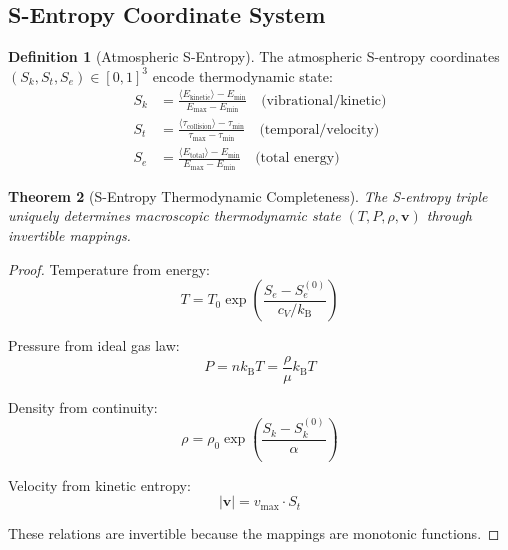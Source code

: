 \documentclass[twocolumn,10pt,a4paper]{article}
\newtheorem{theorem}{Theorem}[section]
\theoremstyle{definition}
\newtheorem{definition}[theorem]{Definition}
\theoremstyle{remark}
\newcommand{\kB}{k_{\mathrm{B}}}
\begin{document}
\subsection{S-Entropy Coordinate System}

\begin{definition}[Atmospheric S-Entropy]
\label{def:s_entropy_atm}
The atmospheric S-entropy coordinates $(S_k, S_t, S_e) \in [0,1]^3$ encode thermodynamic state:
\begin{align}
    S_k &= \frac{\langle E_{\text{kinetic}} \rangle - E_{\min}}{E_{\max} - E_{\min}} \quad \text{(vibrational/kinetic)} \\
    S_t &= \frac{\langle \tau_{\text{collision}} \rangle - \tau_{\min}}{\tau_{\max} - \tau_{\min}} \quad \text{(temporal/velocity)} \\
    S_e &= \frac{\langle E_{\text{total}} \rangle - E_{\min}}{E_{\max} - E_{\min}} \quad \text{(total energy)}
\end{align}
\end{definition}

\begin{theorem}[S-Entropy Thermodynamic Completeness]
\label{thm:completeness}
The S-entropy triple uniquely determines macroscopic thermodynamic state $(T, P, \rho, \mathbf{v})$ through invertible mappings.
\end{theorem}

\begin{proof}
Temperature from energy:
\begin{equation}
    T = T_0 \exp\left(\frac{S_e - S_e^{(0)}}{c_V/\kB}\right)
\end{equation}

Pressure from ideal gas law:
\begin{equation}
    P = n\kB T = \frac{\rho}{\mu}\kB T
\end{equation}

Density from continuity:
\begin{equation}
    \rho = \rho_0 \exp\left(\frac{S_k - S_k^{(0)}}{\alpha}\right)
\end{equation}

Velocity from kinetic entropy:
\begin{equation}
    |\mathbf{v}| = v_{\text{max}} \cdot S_t
\end{equation}

These relations are invertible because the mappings are monotonic functions.
\end{proof}

\end{document}
